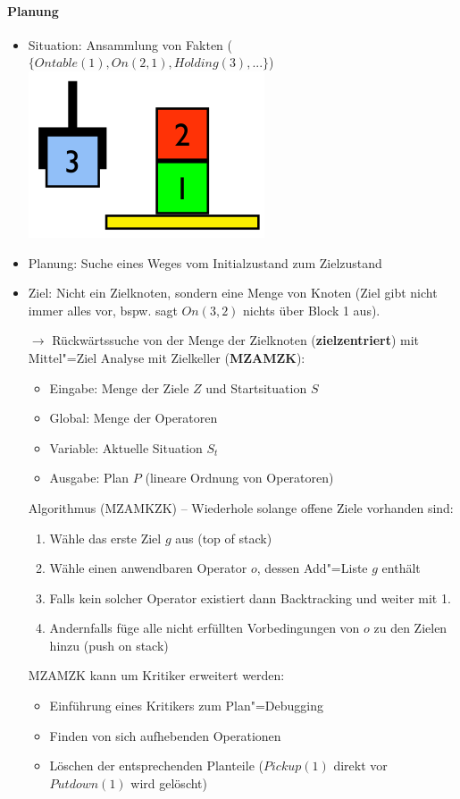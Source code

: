 \paragraph{Planung}
\begin{itemize}
	\item Situation: Ansammlung von Fakten ($\{ Ontable(1), On(2, 1), Holding(3), ... \}$)\\
	\includegraphics[width=.2\textwidth]{figures/ch06_strips-bsp.png}
	\item Planung: Suche eines Weges vom Initialzustand zum Zielzustand
	\item Ziel: Nicht ein Zielknoten, sondern eine Menge von Knoten (Ziel gibt nicht immer alles vor, bspw. sagt $On(3,2)$ nichts über Block 1 aus).
	\item [$\rightarrow$] Rückwärtssuche von der Menge der Zielknoten (\textbf{zielzentriert}) mit Mittel"=Ziel Analyse mit Zielkeller (\textbf{MZAMZK}):
	\begin{itemize}
		\item Eingabe: Menge der Ziele $Z$ und Startsituation $S$
		\item Global: Menge der Operatoren
		\item Variable: Aktuelle Situation $S_t$
		\item Ausgabe: Plan $P$ (lineare Ordnung von Operatoren)
	\end{itemize}
	Algorithmus (MZAMKZK) -- Wiederhole solange offene Ziele vorhanden sind:
	\begin{enumerate}
		 \item Wähle das erste Ziel $g$ aus (top of stack)
		 \item Wähle einen anwendbaren Operator $o$, dessen Add"=Liste $g$ enthält
		 \item Falls kein solcher Operator existiert dann Backtracking und weiter mit 1.
		 \item Andernfalls füge alle nicht erfüllten Vorbedingungen von $o$ zu den Zielen hinzu (push on stack)
	\end{enumerate}
	MZAMZK kann um Kritiker erweitert werden:
	\begin{itemize}
		\item Einführung eines Kritikers zum Plan"=Debugging
		\item Finden von sich aufhebenden Operationen
		\item Löschen der entsprechenden Planteile ($Pickup(1)$ direkt vor $Putdown(1)$ wird gelöscht)
	\end{itemize}
\end{itemize}

